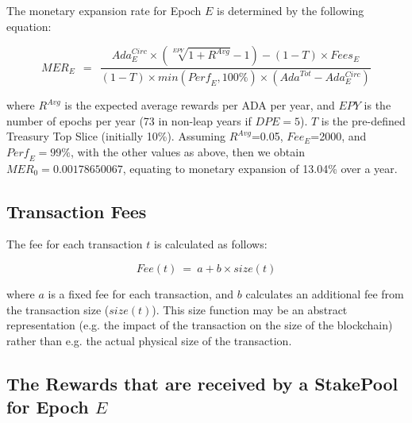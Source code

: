 \documentclass[11pt,a4paper,dvipsnames,twosided,final]{article}
\newcommand{\ada}{ADA{}}
\begin{document}
\noindent
The monetary expansion rate for Epoch $E$ is determined by the following equation:

$$
\textit{MER}_E ~~=~~ \frac{\textit{Ada}^{Circ}_E \times (\sqrt[\textit{EPY}]{1+R^{\textit{Avg}}} - 1) - (1- T) \times \textit{Fees}_E}
                          {(1-T) \times \textit{min}(\textit{Perf}_E,100\%) \times (\textit{Ada}^{Tot} - Ada^{Circ}_E)}
$$

\noindent
where $R^{\textit{Avg}}$ is the expected average rewards per \ada{} per year, and $\textit{EPY}$ is the number of epochs per year (73 in non-leap years if
$\textit{DPE} = 5$). $T$ is the pre-defined Treasury Top Slice (initially 10\%).
%
Assuming $R^{\textit{Avg}}$=0.05, $\textit{Fee}_E$=2000, and $\textit{Perf}_E=99\%$, with the other values as above, then we obtain
$\textit{MER}_0 = 0.00178650067$, equating to monetary expansion of 13.04\% over a year.

\subsection{Transaction Fees}
\label{sec:fees}

The fee for each transaction $t$ is calculated as follows:

$$
\textit{Fee} (t) ~=~ a + b \times \textit{size}(t)
$$

\noindent
where $a$ is a fixed fee for each transaction, and $b$ calculates an additional fee from the transaction size ($\textit{size}(t)$).
This size function may be an abstract representation (e.g. the impact of the transaction on the size of the blockchain) rather than e.g.
the actual physical size of the transaction.

\clearpage
\subsection{The Rewards that are received by a StakePool for Epoch $E$}
\end{document}
